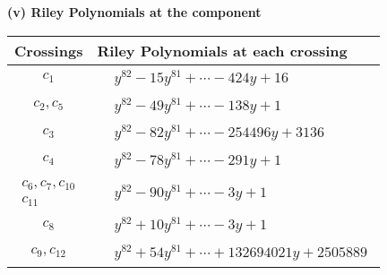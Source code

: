 \documentclass[1p]{elsarticle_modified}
\theoremstyle{definition}
\begin{document}
\newpage\renewcommand{\arraystretch}{1}
\flushleft \textbf{(v) Riley Polynomials at the component}\newline \\
\begin{tabular}{m{50pt}|m{274pt}}
Crossings & \hspace{64pt}Riley Polynomials at each crossing \\
\hline $$\begin{aligned}c_{1}\end{aligned}$$&$\begin{aligned}
&y^{82}-15 y^{81}+\cdots-424 y+16
\end{aligned}$\\
\hline $$\begin{aligned}c_{2},c_{5}\end{aligned}$$&$\begin{aligned}
&y^{82}-49 y^{81}+\cdots-138 y+1
\end{aligned}$\\
\hline $$\begin{aligned}c_{3}\end{aligned}$$&$\begin{aligned}
&y^{82}-82 y^{81}+\cdots-254496 y+3136
\end{aligned}$\\
\hline $$\begin{aligned}c_{4}\end{aligned}$$&$\begin{aligned}
&y^{82}-78 y^{81}+\cdots-291 y+1
\end{aligned}$\\
\hline $$\begin{aligned}c_{6},c_{7},c_{10}\\c_{11}\end{aligned}$$&$\begin{aligned}
&y^{82}-90 y^{81}+\cdots-3 y+1
\end{aligned}$\\
\hline $$\begin{aligned}c_{8}\end{aligned}$$&$\begin{aligned}
&y^{82}+10 y^{81}+\cdots-3 y+1
\end{aligned}$\\
\hline $$\begin{aligned}c_{9},c_{12}\end{aligned}$$&$\begin{aligned}
&y^{82}+54 y^{81}+\cdots+132694021 y+2505889
\end{aligned}$\\
\hline
\end{tabular}\\~\\
\end{document}
